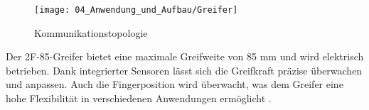 	\begin{figure}[h!]
		\centering
		\texttt{[image: 04\_Anwendung\_und\_Aufbau/Greifer]}
		\captionsetup{justification=centering}
		\caption{Kommunikationstopologie}
		\label{fig:Greifer}
	\end{figure}
	
	Der 2F-85-Greifer bietet eine maximale Greifweite von 85 mm und wird elektrisch betrieben. Dank integrierter Sensoren lässt sich die Greifkraft präzise überwachen und anpassen. Auch die Fingerposition wird überwacht, was dem Greifer eine hohe Flexibilität in verschiedenen Anwendungen ermöglicht \cite{2F-85}.